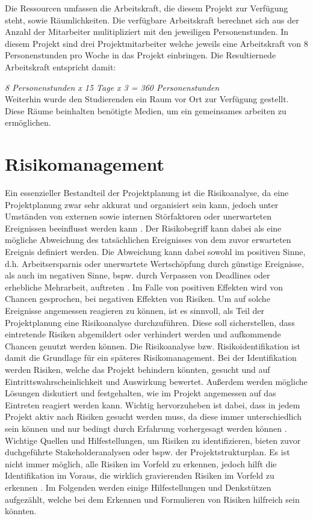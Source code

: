 \documentclass[ThesisDJ.tex]{subfiles}
\begin{document}
Die Ressourcen umfassen die Arbeitskraft, die diesem Projekt zur Verfügung steht, sowie Räumlichkeiten. 
Die verfügbare Arbeitskraft berechnet sich aus der Anzahl der Mitarbeiter mulitipliziert mit den jeweiligen Personenstunden.
In diesem Projekt sind drei Projektmitarbeiter welche jeweils eine Arbeitskraft von 8 Personenstunden pro Woche in das Projekt einbringen. 
Die Resultiernede Arbeitskraft entspricht damit:

		\emph{8 Personenstunden x 15 Tage x 3 = 360 Personenstunden}\\
Weiterhin wurde den Studierenden ein Raum vor Ort zur Verfügung gestellt. Diese Räume beinhalten benötigte Medien, um ein gemeinsames arbeiten zu ermöglichen.

\section{Risikomanagement}
Ein essenzieller Bestandteil der Projektplanung ist die Risikoanalyse, da eine Projektplanung zwar sehr akkurat und organisiert sein kann, jedoch unter Umständen von externen sowie internen Störfaktoren oder unerwarteten Ereignissen beeinflusst werden kann \cite{cicek2022risikomanagement}.
Der Risikobegriff kann dabei als eine mögliche Abweichung des tatsächlichen Ereignisses von dem zuvor erwarteten Ereignis definiert werden. Die Abweichung kann dabei sowohl im positiven Sinne, d.h. Arbeitsersparnis oder unerwartete Wertschöpfung durch günstige Ereignisse, als auch im negativen Sinne, bspw. durch Verpassen von Deadlines oder erhebliche Mehrarbeit, auftreten \cite{holgerseibold2006}. Im Falle von positiven Effekten wird von Chancen gesprochen, bei negativen Effekten von Risiken. Um auf solche Ereignisse angemessen reagieren zu können, ist es sinnvoll, als Teil der Projektplanung eine Risikoanalyse durchzuführen. Diese soll sicherstellen, dass eintretende Risiken abgemildert oder verhindert werden und aufkommende Chancen genutzt werden können. Die Risikoanalyse bzw. Risikoidentifikation ist damit die Grundlage für ein späteres Risikomanagement.
Bei der Identifikation werden Risiken, welche das Projekt behindern könnten, gesucht und auf Eintrittswahrscheinlichkeit und Auswirkung bewertet. Außerdem werden mögliche Lösungen diskutiert und festgehalten, wie im Projekt angemessen auf das Eintreten reagiert werden kann. Wichtig hervorzuheben ist dabei, dass in jedem Projekt aktiv nach Risiken gesucht werden muss, da diese immer unterschiedlich sein können und nur bedingt durch Erfahrung vorhergesagt werden können \cite{cicek2022risikomanagement}. Wichtige Quellen und Hilfestellungen, um Risiken zu identifizieren, bieten zuvor duchgeführte Stakeholderanalysen oder bspw. der Projektstrukturplan. Es ist nicht immer möglich, alle Risiken im Vorfeld zu erkennen, jedoch hilft die Identifikation im Voraus, die wirklich gravierenden Risiken im Vorfeld zu erkennen \cite{holgerseibold2006}. Im Folgenden werden einige Hilfestellungen und Denkstützen aufgezählt, welche bei dem Erkennen und Formulieren von Risiken hilfreich sein könnten.
\end{document}
